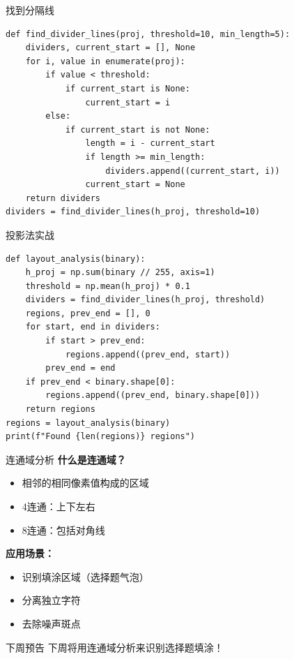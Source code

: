 \begin{frame}[fragile]{找到分隔线}
    \begin{lstlisting}[basicstyle=\ttfamily\scriptsize]
def find_divider_lines(proj, threshold=10, min_length=5):
    dividers, current_start = [], None
    for i, value in enumerate(proj):
        if value < threshold:
            if current_start is None:
                current_start = i
        else:
            if current_start is not None:
                length = i - current_start
                if length >= min_length:
                    dividers.append((current_start, i))
                current_start = None
    return dividers
dividers = find_divider_lines(h_proj, threshold=10)
    \end{lstlisting}

\end{frame}

\begin{frame}[fragile]{投影法实战}
    \begin{lstlisting}[basicstyle=\ttfamily\scriptsize]
def layout_analysis(binary):
    h_proj = np.sum(binary // 255, axis=1)
    threshold = np.mean(h_proj) * 0.1
    dividers = find_divider_lines(h_proj, threshold)
    regions, prev_end = [], 0
    for start, end in dividers:
        if start > prev_end:
            regions.append((prev_end, start))
        prev_end = end
    if prev_end < binary.shape[0]:
        regions.append((prev_end, binary.shape[0]))
    return regions
regions = layout_analysis(binary)
print(f"Found {len(regions)} regions")
    \end{lstlisting}

\end{frame}

\begin{frame}{连通域分析}
    \textbf{什么是连通域？}
    \begin{itemize}
        \item 相邻的相同像素值构成的区域
        \item 4连通：上下左右
        \item 8连通：包括对角线
    \end{itemize}

    \vspace{0.3cm}

    \textbf{应用场景：}
    \begin{itemize}
        \item 识别填涂区域（选择题气泡）
        \item 分离独立字符
        \item 去除噪声斑点
    \end{itemize}

    \begin{alertblock}{下周预告}
        下周将用连通域分析来识别选择题填涂！
    \end{alertblock}
\end{frame}


